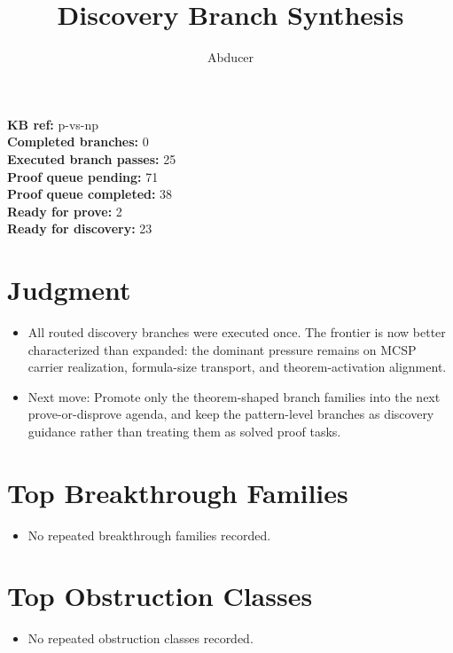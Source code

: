 \documentclass[11pt]{article}
\title{Discovery Branch Synthesis}
\author{Abducer}
\date{}
\begin{document}
\maketitle

\noindent
\textbf{KB ref:} p-vs-np\\
\textbf{Completed branches:} 0\\
\textbf{Executed branch passes:} 25\\
\textbf{Proof queue pending:} 71\\
\textbf{Proof queue completed:} 38\\
\textbf{Ready for prove:} 2\\
\textbf{Ready for discovery:} 23

\section*{Judgment}
\begin{itemize}
\item All routed discovery branches were executed once. The frontier is now better characterized than expanded: the dominant pressure remains on MCSP carrier realization, formula-size transport, and theorem-activation alignment.
\item Next move: Promote only the theorem-shaped branch families into the next prove-or-disprove agenda, and keep the pattern-level branches as discovery guidance rather than treating them as solved proof tasks.
\end{itemize}

\section*{Top Breakthrough Families}
\begin{itemize}
\item No repeated breakthrough families recorded.
\end{itemize}

\section*{Top Obstruction Classes}
\begin{itemize}
\item No repeated obstruction classes recorded.
\end{itemize}
\end{document}
